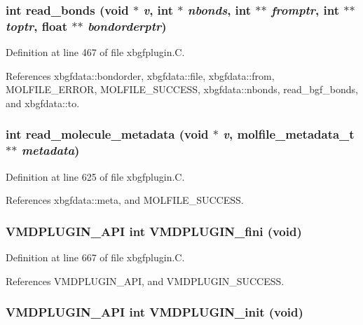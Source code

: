 \subsubsection{\setlength{\rightskip}{0pt plus 5cm}int read\_\-bonds (void $\ast$ {\em v}, int $\ast$ {\em nbonds}, int $\ast$$\ast$ {\em fromptr}, int $\ast$$\ast$ {\em toptr}, float $\ast$$\ast$ {\em bondorderptr})\hspace{0.3cm}{\tt  [static]}}\label{xbgfplugin_8C_a11}




Definition at line 467 of file xbgfplugin.C.

References xbgfdata::bondorder, xbgfdata::file, xbgfdata::from, MOLFILE\_\-ERROR, MOLFILE\_\-SUCCESS, xbgfdata::nbonds, read\_\-bgf\_\-bonds, and xbgfdata::to.
\subsubsection{\setlength{\rightskip}{0pt plus 5cm}int read\_\-molecule\_\-metadata (void $\ast$ {\em v}, {\bf molfile\_\-metadata\_\-t} $\ast$$\ast$ {\em metadata})\hspace{0.3cm}{\tt  [static]}}\label{xbgfplugin_8C_a16}




Definition at line 625 of file xbgfplugin.C.

References xbgfdata::meta, and MOLFILE\_\-SUCCESS.
\subsubsection{\setlength{\rightskip}{0pt plus 5cm}VMDPLUGIN\_\-API int VMDPLUGIN\_\-fini (void)}\label{xbgfplugin_8C_a19}




Definition at line 667 of file xbgfplugin.C.

References VMDPLUGIN\_\-API, and VMDPLUGIN\_\-SUCCESS.
\subsubsection{\setlength{\rightskip}{0pt plus 5cm}VMDPLUGIN\_\-API int VMDPLUGIN\_\-init (void)}\label{xbgfplugin_8C_a17}




